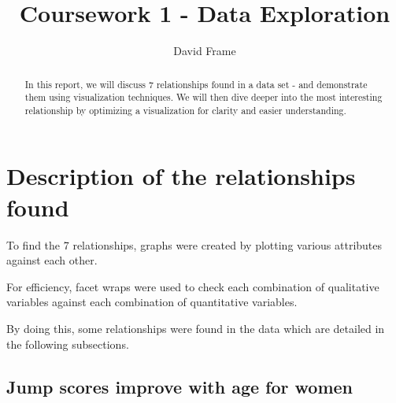 \documentclass[runningheads]{llncs}
\begin{document}
%
\title{Coursework 1 - Data Exploration}
%
%
\author{David Frame}
%
%
%
\maketitle              %
%
\begin{abstract}
In this report, we will discuss 7 relationships found in a data set - and demonstrate them using visualization techniques. We will then dive deeper into the most interesting relationship by optimizing a visualization for clarity and easier understanding.


\end{abstract}
%
%
\section{Description of the relationships found}

To find the 7 relationships, graphs were created by plotting various attributes against each other. 

For efficiency, facet wraps were used to check each combination of qualitative variables against each combination of quantitative variables.

By doing this, some relationships were found in the data which are detailed in the following subsections.

\subsection{Jump scores improve with age for women}


\end{document}
